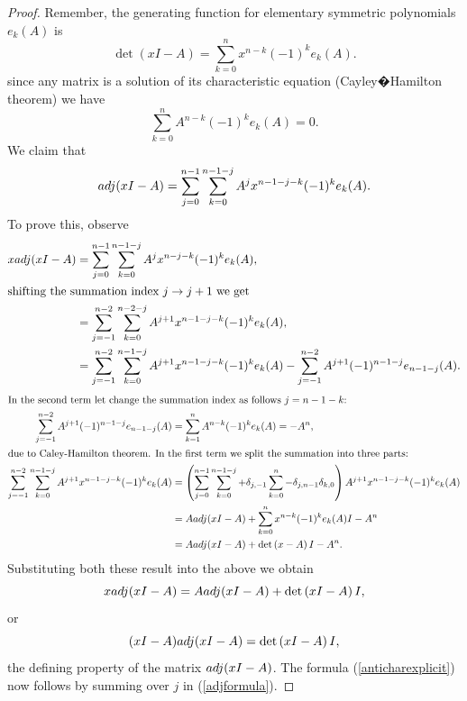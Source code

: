 \documentclass[10pt,a4paper,reqno]{amsart}
\newtheorem{lm}[defi]{\bf L\scriptsize EMMA \normalsize}
\newenvironment{lemma}{\begin{lm}\it}{\end{lm}}
\newcommand{\zav}[1]{\left( #1 \right)}
\newcommand{\deter}[1]{\det\zav{#1}}
\newcommand{\trunc}[1]{\left\lfloor #1 \right\rfloor}
\begin{document}
\begin{proof}
Remember, the generating function for elementary symmetric polynomials $e_k(A)$ is 
$$
\deter{xI-A}=\sum_{k=0}^n x^{n-k}(-1)^ke_k(A).
$$ 
since any matrix is a solution of its characteristic equation (Cayley�Hamilton theorem) we have
$$
\sum_{k=0}^n A^{n-k}(-1)^ke_k(A)=0.
$$
We claim that
\begin{equation}\label{adjformula}
{\rm adj}(xI-A)=\sum_{j=0}^{n-1}\sum_{k=0}^{n-1-j} A^j x^{n-1-j-k}(-1)^k e_k(A).
\end{equation}
To prove this, observe
\begin{align*}
x{\rm adj}(xI-A)&=\sum_{j=0}^{n-1}\sum_{k=0}^{n-1-j} A^j x^{n-j-k}(-1)^k e_k(A),\\
\intertext{shifting the summation index $j\to j+1$ we get}
&=\sum_{j=-1}^{n-2}\sum_{k=0}^{n-2-j} A^{j+1} x^{n-1-j-k}(-1)^k e_k(A),\\
&=\sum_{j=-1}^{n-2}\sum_{k=0}^{n-1-j} A^{j+1} x^{n-1-j-k}(-1)^k e_k(A)-\sum_{j=-1}^{n-2}A^{j+1}(-1)^{n-1-j}e_{n-1-j}(A).
\end{align*}
\begin{align*}
\intertext{In the second term let change the summation index as follows $j=n-1-k$:}
\sum_{j=-1}^{n-2}A^{j+1}(-1)^{n-1-j}e_{n-1-j}(A)&=\sum_{k=1}^{n}A^{n-k}(-1)^{k}e_{k}(A)=-A^n,\\
\intertext{due to Caley-Hamilton theorem. In the first term we split the summation into three parts: }
\sum_{j=-1}^{n-2}\sum_{k=0}^{n-1-j} A^{j+1} x^{n-1-j-k}(-1)^k e_k(A)&=
\zav{\sum_{j=0}^{n-1}\sum_{k=0}^{n-1-j}+\delta_{j,-1}\sum_{k=0}^{n}-\delta_{j,n-1}\delta_{k,0}}A^{j+1} x^{n-1-j-k}(-1)^k e_k(A)\\
&=A{\rm adj}(xI-A)+\sum_{k=0}^n x^{n-k}(-1)^ke_k(A)I-A^n\\
&=A{\rm adj}(xI-A)+\deter{x-A}I-A^n.
\end{align*}
Substituting both these result into the above we obtain
$$
x{\rm adj}(xI-A)=A{\rm adj}(xI-A)+\deter{xI-A}I,
$$
or
$$
(xI-A){\rm adj}(xI-A)=\deter{xI-A}I,
$$
the defining property of the matrix ${\rm adj}(xI-A)$.
The formula (\ref{anticharexplicit}) now follows by summing over $j$ in (\ref{adjformula}).
\end{proof}
\end{document}

